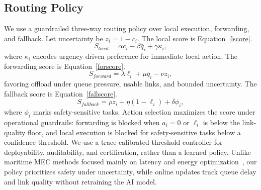 \documentclass[10pt, conference]{IEEEtran}
\begin{document}
\subsection{Routing Policy}
We use a guardrailed three-way routing policy over local execution, forwarding, and fallback. Let uncertainty be $z_i=1-c_i$. The local score is Equation~\ref{lscore}.
\begin{equation}
    S_{local}=\alpha c_i - \beta \bar{q}_i + \gamma \kappa_i,\label{lscore}
\end{equation}
where $\kappa_i$ encodes urgency-driven preference for immediate local action. The forwarding score is Equation~\ref{forscore}.
\begin{equation}
    S_{forward}=\lambda \ell_i + \mu \bar{q}_i - \nu z_i,\label{forscore}
\end{equation}
favoring offload under queue pressure, usable links, and bounded uncertainty. The fallback score is Equation~\ref{fallscore}.
\begin{equation}
    S_{fallback}=\rho z_i + \eta (1-\ell_i) + \delta \phi_i,\label{fallscore}
\end{equation}
where $\phi_i$ marks safety-sensitive tasks.
Action selection maximizes the score under operational guardrails: forwarding is blocked when $a_i=0$ or $\ell_i$ is below the link-quality floor, and local execution is blocked for safety-sensitive tasks below a confidence threshold. We use a trace-calibrated threshold controller for deployability, auditability, and certification, rather than a learned policy. Unlike maritime MEC methods focused mainly on latency and energy optimization~\cite{shi2020edgeai, yang2022mab_maritime, he2025distributed_maritime, ning2025marho}, our policy prioritizes safety under uncertainty, while online updates track queue delay and link quality without retraining the AI model.
\end{document}
